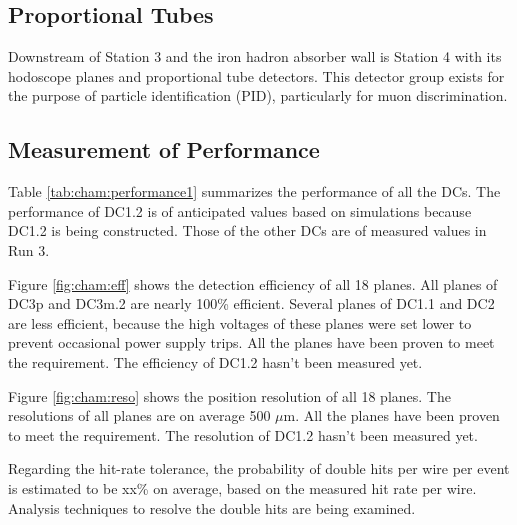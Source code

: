 \subsection{Proportional Tubes}

Downstream of Station 3 and the iron hadron absorber wall is Station 4 with its hodoscope planes and proportional tube detectors. This detector group exists for the purpose of particle identification (PID), particularly for muon discrimination.

\subsection{Measurement of Performance}

Table \ref{tab:cham:performance1} summarizes the performance of all the DCs.
The performance of DC1.2 is of anticipated values based on simulations
because DC1.2 is being constructed.
Those of the other DCs are of measured values in Run 3.

Figure \ref{fig:cham:eff} shows the detection efficiency of all 18 planes.
All planes of DC3p and DC3m.2 are nearly 100\% efficient.
Several planes of DC1.1 and DC2 are less efficient,
because the high voltages of these planes were set lower
to prevent occasional power supply trips.
All the planes have been proven to meet the requirement.
The efficiency of DC1.2 hasn't been measured yet.

Figure \ref{fig:cham:reso} shows the position resolution of all 18 planes.
The resolutions of all planes are on average 500 $\mu$m.
All the planes have been proven to meet the requirement.
The resolution of DC1.2 hasn't been measured yet.

Regarding the hit-rate tolerance,
the probability of double hits per wire per event is estimated to be xx\% on average,
based on the measured hit rate per wire.
Analysis techniques to resolve the double hits are being examined.

